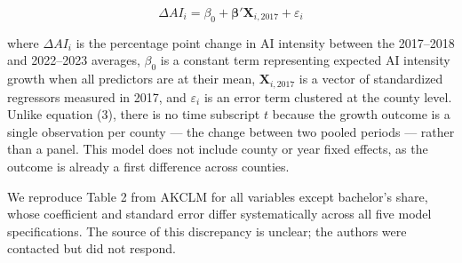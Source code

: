 \documentclass[
]{article}
\begin{document}
\[
\Delta AI_{i} = \beta_0 + \boldsymbol{\beta}' \mathbf{X}_{i,2017} + \varepsilon_{i} \tag{5}
\]

where \(\Delta AI_{i}\) is the percentage point change in AI intensity
between the 2017--2018 and 2022--2023 averages, \(\beta_0\) is a
constant term representing expected AI intensity growth when all
predictors are at their mean, \(\mathbf{X}_{i,2017}\) is a vector of
standardized regressors measured in 2017, and \(\varepsilon_{i}\) is an
error term clustered at the county level. Unlike equation (3), there is
no time subscript \(t\) because the growth outcome is a single
observation per county --- the change between two pooled periods ---
rather than a panel. This model does not include county or year fixed
effects, as the outcome is already a first difference across counties.

We reproduce Table 2 from AKCLM for all variables except bachelor's
share, whose coefficient and standard error differ systematically across
all five model specifications. The source of this discrepancy is
unclear; the authors were contacted but did not respond.
\end{document}
